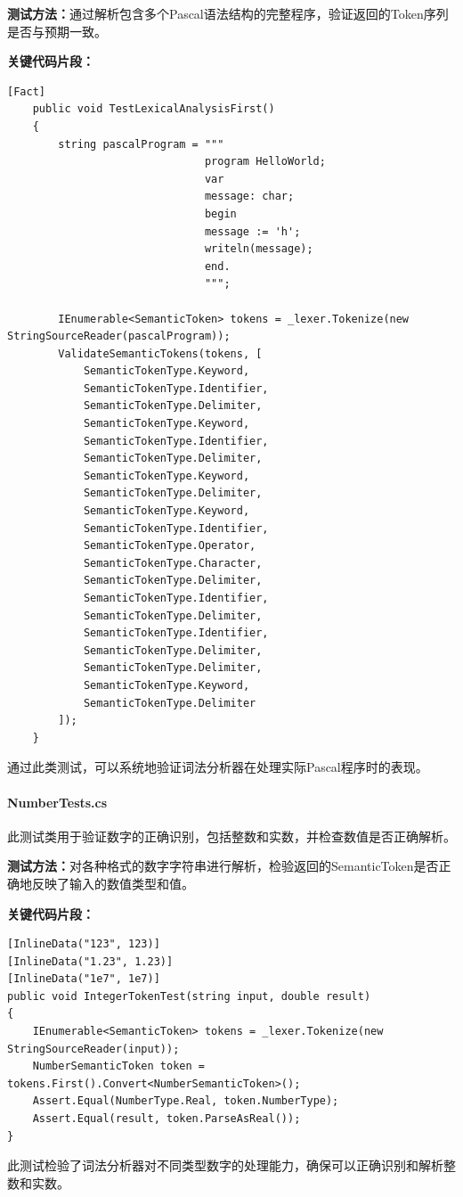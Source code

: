 \documentclass[../main.tex]{subfiles}
\begin{document}
\textbf{测试方法：}通过解析包含多个Pascal语法结构的完整程序，验证返回的Token序列是否与预期一致。

\textbf{关键代码片段：}
\begin{lstlisting}[style=csharp]
    [Fact]
    public void TestLexicalAnalysisFirst()
    {
        string pascalProgram = """
                               program HelloWorld;
                               var
                               message: char;
                               begin
                               message := 'h';
                               writeln(message);
                               end.
                               """;

        IEnumerable<SemanticToken> tokens = _lexer.Tokenize(new StringSourceReader(pascalProgram));
        ValidateSemanticTokens(tokens, [
            SemanticTokenType.Keyword,
            SemanticTokenType.Identifier,
            SemanticTokenType.Delimiter,
            SemanticTokenType.Keyword,
            SemanticTokenType.Identifier,
            SemanticTokenType.Delimiter,
            SemanticTokenType.Keyword,
            SemanticTokenType.Delimiter,
            SemanticTokenType.Keyword,
            SemanticTokenType.Identifier,
            SemanticTokenType.Operator,
            SemanticTokenType.Character,
            SemanticTokenType.Delimiter,
            SemanticTokenType.Identifier,
            SemanticTokenType.Delimiter,
            SemanticTokenType.Identifier,
            SemanticTokenType.Delimiter,
            SemanticTokenType.Delimiter,
            SemanticTokenType.Keyword,
            SemanticTokenType.Delimiter
        ]);
    }
\end{lstlisting}
通过此类测试，可以系统地验证词法分析器在处理实际Pascal程序时的表现。

\paragraph{NumberTests.cs}
此测试类用于验证数字的正确识别，包括整数和实数，并检查数值是否正确解析。

\textbf{测试方法：}对各种格式的数字字符串进行解析，检验返回的SemanticToken是否正确地反映了输入的数值类型和值。

\textbf{关键代码片段：}
\begin{lstlisting}[style=csharp]
[InlineData("123", 123)]
[InlineData("1.23", 1.23)]
[InlineData("1e7", 1e7)]
public void IntegerTokenTest(string input, double result)
{
    IEnumerable<SemanticToken> tokens = _lexer.Tokenize(new StringSourceReader(input));
    NumberSemanticToken token = tokens.First().Convert<NumberSemanticToken>();
    Assert.Equal(NumberType.Real, token.NumberType);
    Assert.Equal(result, token.ParseAsReal());
}
\end{lstlisting}
此测试检验了词法分析器对不同类型数字的处理能力，确保可以正确识别和解析整数和实数。
\end{document}
